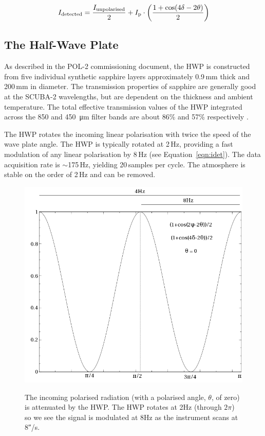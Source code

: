 \begin{equation}
\label{eqn:idet}
I_{\textnormal{detected}} =
\frac{I_{\textnormal{unpolarised}}}{2}+I_{\textnormal{p}}\cdot\left(\frac{1+\cos(4\delta - 2\theta)}{2} \right)
\end{equation}




\subsection*{The Half-Wave Plate}

As described in the POL-2 commissioning document, the HWP is
constructed from five individual synthetic sapphire layers
approximately 0.9\,mm thick and 200\,mm in diameter. The transmission
properties of sapphire are generally good at the SCUBA-2 wavelengths,
but are dependent on the thickness and ambient temperature. The total
effective transmission values of the HWP integrated across the 850 and
\SI{450}{\micro\metre} filter bands are about 86\% and 57\%
respectively \cite{Savini}.

The HWP rotates the incoming linear polarisation with twice the speed
of the wave plate angle.  The HWP is typically rotated at 2\,Hz,
providing a fast modulation of any linear polarisation by 8\,Hz (see
Equation~\ref{eqn:idet}).  The data acquisition rate is $\sim$175\,Hz, yielding
20\,samples per cycle.  The atmosphere is stable on the order of 2\,Hz and
can be removed.


\begin{figure}[t!]
\begin{center}
\includegraphics[width=0.7\linewidth]{hwp-modulation.png}
\label{fig:hwpmodulation}
\caption [Attenuation of signal by HWP]{The incoming polarised
  radiation (with a polarised angle, $\theta$, of zero) is attenuated
  by the HWP.  The HWP rotates at 2Hz (through $2\pi$) so we see the
  signal is modulated at 8Hz as the instrument scans at
  8\si{\arcsecond}/s. }
\end{center}
\end{figure}


